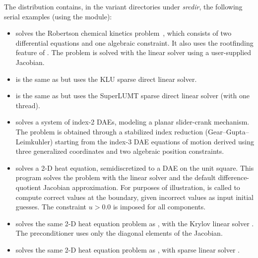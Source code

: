 \vspace{0.2in}\noindent
The {\ida} distribution contains, in the  variant directories under
{\em srcdir}, the following serial examples (using the
{\nvecs} module):
\begin{itemize}

\item {}
  solves the Robertson chemical kinetics problem~\cite{Rob:66}, which consists
  of two differential equations and one algebraic constraint.  It also uses
  the rootfinding feature of {\ida}.
  The problem is solved with the {\sunlinsoldense} linear solver using
  a user-supplied Jacobian.

\item {}
  is the same as  but uses the KLU sparse direct linear solver.

\item {}
  is the same as  but uses the SuperLUMT sparse direct linear
  solver (with one thread).

\item {}
  solves a system of index-2 DAEs, modeling a planar slider-crank mechanism.
  The problem is obtained through a stabilized index reduction (Gear--Gupta--Leimkuhler)
  starting from the index-3 DAE equations of motion derived using three generalized
  coordinates and two algebraic position constraints.

\item {}
  solves a 2-D heat equation, semidiscretized to a DAE on the unit square.
  This program solves the problem with the {\sunlinsolband} linear solver and
  the default difference-quotient Jacobian approximation. For purposes of
  illustration,  is called to compute correct values at the
  boundary, given incorrect values as input initial guesses. The constraint
  $u > 0.0$ is imposed for all components.

\item {}
  solves the same 2-D heat equation problem as , with the Krylov
  linear solver {\sunlinsolspgmr}. The preconditioner uses only the diagonal elements
  of the Jacobian.

\item {}
  solves the same 2-D heat equation problem as , with
  sparse linear solver {\sunlinsolklu}.


\end{itemize}
